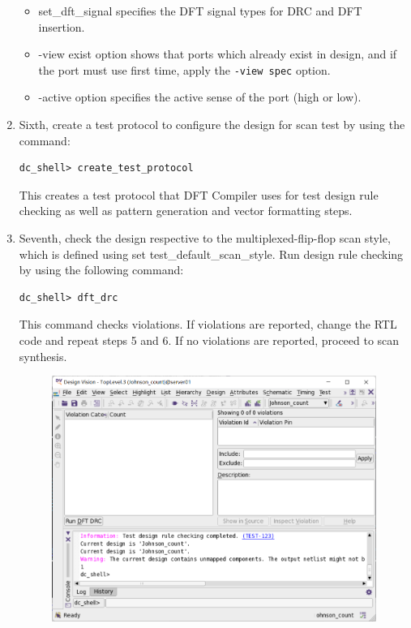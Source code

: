 \documentclass[a4paper,12pt,twoside]{article}
\begin{document}
\begin{enumerate}
    \begin{itemize}
        \item set\_dft\_signal specifies the DFT signal types for DRC and DFT insertion.
        \item -view exist option shows that ports which already exist in design, and if the port must use first time, apply the \texttt{-view spec} option.
        \item -active option specifies the active sense of the port (high or low).
    \end{itemize}
    \item Sixth, create a test protocol to configure the design for scan test by using the command:
    \begin{verbatim}
dc_shell> create_test_protocol
    \end{verbatim}
    This creates a test protocol that DFT Compiler uses for test design rule checking as well as pattern generation and vector formatting steps.
    \item Seventh, check the design respective to the multiplexed-flip-flop scan style, which is defined using set test\_default\_scan\_style. Run design rule checking by using the following command:
    \begin{verbatim}
dc_shell> dft_drc
    \end{verbatim}
    This command checks violations. If violations are reported, change the RTL code and repeat steps 5 and 6. If no violations are reported, proceed to scan synthesis.
    \begin{figure}[H]
        \centering
        \includegraphics[width=\textwidth]{images/26.png}

\end{figure}
\end{enumerate}
\end{document}
